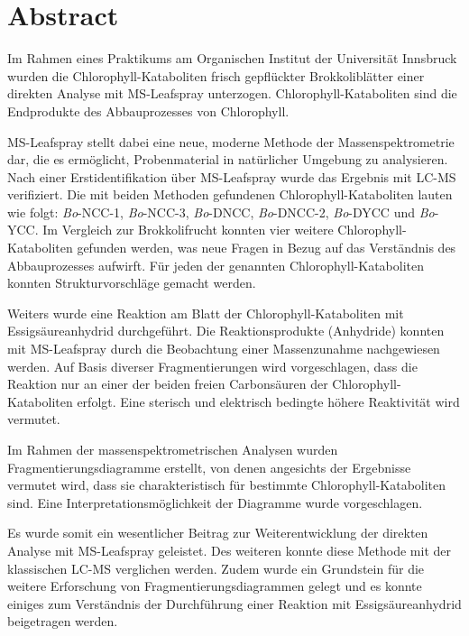 

\chapter*{Abstract}
\label{cha:abstract}

Im Rahmen eines Praktikums am Organischen Institut der Universität Innsbruck wurden die Chlorophyll-Kataboliten frisch gepflückter Brokkoliblätter einer direkten Analyse mit MS-Leafspray unterzogen. Chlorophyll-Kataboliten sind die Endprodukte des Abbauprozesses von Chlorophyll.

MS-Leafspray stellt dabei eine neue, moderne Methode der Massenspektrometrie dar, die es ermöglicht, Probenmaterial in natürlicher Umgebung zu analysieren. Nach einer Erstidentifikation über MS-Leafspray wurde das Ergebnis mit LC-MS verifiziert. Die mit beiden Methoden gefundenen Chlorophyll-Kataboliten lauten wie folgt: \textit{Bo}-NCC-1, \textit{Bo}-NCC-3, \textit{Bo}-DNCC, \textit{Bo}-DNCC-2, \textit{Bo}-DYCC und \textit{Bo}-YCC. Im Vergleich zur Brokkolifrucht konnten vier weitere Chlorophyll-Kataboliten gefunden werden, was neue Fragen in Bezug auf das Verständnis des Abbauprozesses aufwirft. Für jeden der genannten Chlorophyll-Kataboliten konnten Strukturvorschläge gemacht werden.

Weiters wurde eine Reaktion am Blatt der Chlorophyll-Kataboliten mit Essigsäureanhydrid durchgeführt. Die Reaktionsprodukte (Anhydride) konnten mit MS-Leafspray durch die Beobachtung einer Massenzunahme nachgewiesen werden. Auf Basis diverser Fragmentierungen wird vorgeschlagen, dass die Reaktion nur an einer der beiden freien Carbonsäuren der Chlorophyll-Kataboliten erfolgt. Eine sterisch und elektrisch bedingte höhere Reaktivität wird vermutet. 

Im Rahmen der massenspektrometrischen Analysen wurden Fragmentierungsdiagramme erstellt, von denen angesichts der Ergebnisse vermutet wird, dass sie charakteristisch für bestimmte Chlorophyll-Kataboliten sind. Eine Interpretationsmöglichkeit der Diagramme wurde vorgeschlagen. 

Es wurde somit ein wesentlicher Beitrag zur Weiterentwicklung der direkten Analyse mit MS-Leafspray geleistet. Des weiteren konnte diese Methode mit der klassischen LC-MS verglichen werden. Zudem wurde ein Grundstein für die weitere Erforschung von Fragmentierungsdiagrammen gelegt und es konnte einiges zum Verständnis der Durchführung einer Reaktion mit Essigsäureanhydrid beigetragen werden.



